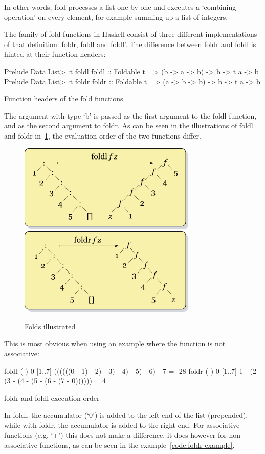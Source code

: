 In other words, fold processes a list one by one and executes a `combining operation'
on every element, for example summing up a list of integers.

The family of fold functions in Haskell consist of three different implementations of
that definition: foldr, foldl and foldl'.
The difference between foldr and foldl is hinted at their function headers:
\begin{listing}
    \begin{haskellcode}
Prelude Data.List> :t foldl
foldl :: Foldable t => (b -> a -> b) -> b -> t a -> b
Prelude Data.List> :t foldr
foldr :: Foldable t => (a -> b -> b) -> b -> t a -> b
    \end{haskellcode}
    \caption{Function headers of the fold functions}
\end{listing}
The argument with type `b' is passed as the first argument to the foldl
function, and as the second argument to foldr. As can be seen in the illustrations
of foldl and foldr in~\ref{fig:fold}, the evaluation order of the two functions
differ.

\begin{figure}[h!]
    \centering
    \includegraphics[scale=0.5]{../img/foldl.png}
    \includegraphics[scale=0.5]{../img/foldr.png}
    \caption{Folds illustrated\autocite{fold-wiki}}
    \label{fig:fold}
\end{figure}

This is most obvious when using an example where the function is not associative:

\begin{listing}
    \begin{haskellcode}
foldl (-) 0 [1..7]
((((((0 - 1) - 2) - 3) - 4) - 5) - 6) - 7 = -28
foldr (-) 0 [1..7]
1 - (2 - (3 - (4 - (5 - (6 - (7 - 0)))))) = 4
    \end{haskellcode}
    \caption{foldr and foldl execution order}\label{code:foldr-example}
\end{listing}
In foldl, the accumulator (`0') is added to the left end of the list (prepended),
while with foldr, the accumulator is added to the right end.
For associative functions (e.g. `+') this does not make a difference, it does
however for non-associative functions, as can be seen in the example~\ref{code:foldr-example}.

